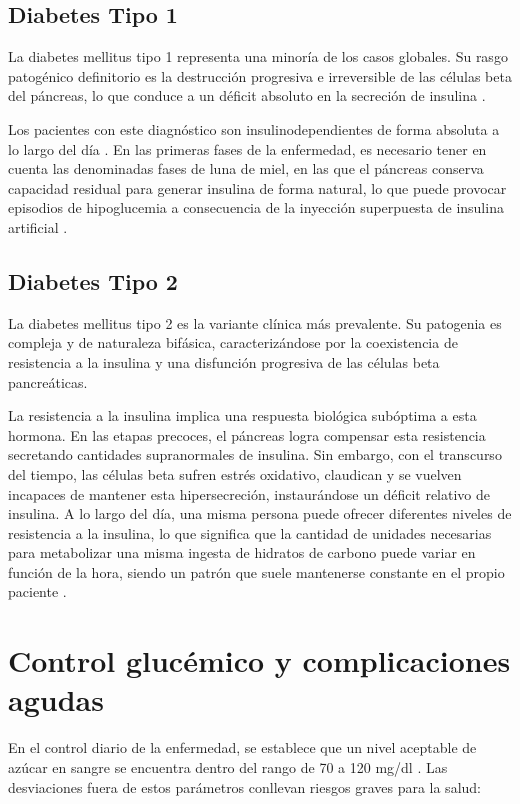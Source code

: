 \subsection{Diabetes Tipo 1}
La diabetes mellitus tipo 1 representa una minoría de los casos globales. Su rasgo patogénico definitorio es la destrucción progresiva e irreversible de las células beta del páncreas, lo que conduce a un déficit absoluto en la secreción de insulina \cite{revespcardiol_diabetes}. 

Los pacientes con este diagnóstico son insulinodependientes de forma absoluta a lo largo del día \cite{ada_standards}. En las primeras fases de la enfermedad, es necesario tener en cuenta las denominadas fases de luna de miel, en las que el páncreas conserva capacidad residual para generar insulina de forma natural, lo que puede provocar episodios de hipoglucemia a consecuencia de la inyección superpuesta de insulina artificial \cite{cinfasalud_diabetes}.

\subsection{Diabetes Tipo 2}
La diabetes mellitus tipo 2 es la variante clínica más prevalente. Su patogenia es compleja y de naturaleza bifásica, caracterizándose por la coexistencia de resistencia a la insulina y una disfunción progresiva de las células beta pancreáticas. 

La resistencia a la insulina implica una respuesta biológica subóptima a esta hormona. En las etapas precoces, el páncreas logra compensar esta resistencia secretando cantidades supranormales de insulina. Sin embargo, con el transcurso del tiempo, las células beta sufren estrés oxidativo, claudican y se vuelven incapaces de mantener esta hipersecreción, instaurándose un déficit relativo de insulina. A lo largo del día, una misma persona puede ofrecer diferentes niveles de resistencia a la insulina, lo que significa que la cantidad de unidades necesarias para metabolizar una misma ingesta de hidratos de carbono puede variar en función de la hora, siendo un patrón que suele mantenerse constante en el propio paciente \cite{doctorsolano_hiperinsulinemia}.

\section{Control glucémico y complicaciones agudas}
En el control diario de la enfermedad, se establece que un nivel aceptable de azúcar en sangre se encuentra dentro del rango de 70 a 120 mg/dl \cite{ada_standards, idf_atlas_diabetes}. Las desviaciones fuera de estos parámetros conllevan riesgos graves para la salud:

